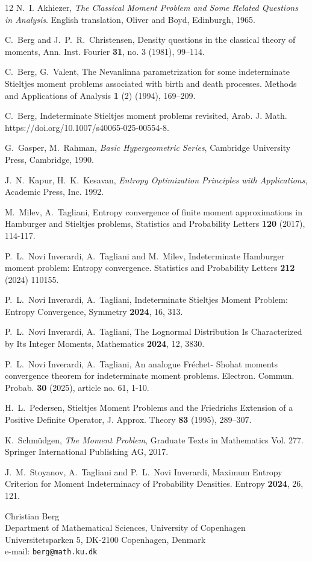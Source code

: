 \documentclass [12pt]{article}
\begin{document}
\begin{thebibliography}{12}
  N.~I. Akhiezer,  {\it The Classical Moment Problem and Some Related
 Questions in Analysis}. English translation, Oliver and Boyd, Edinburgh,
 1965.

 C.~Berg and J.~P.~R.~Christensen,   Density questions in the classical theory of moments,  Ann. Inst. Fourier  {\bf 31}, no. 3 (1981), 99--114.

 C.~Berg, G.~Valent, The Nevanlinna parametrization for some indeterminate Stieltjes moment problems associated with birth and death processes.
Methods and Applications of Analysis {\bf 1} (2) (1994), 169--209.

 C.~Berg, Indeterminate Stieltjes moment problems revisited, Arab. J. Math. https://doi.org/10.1007/s40065-025-00554-8.

 G.~Gasper, M.~Rahman, {\it Basic Hypergeometric Series}, Cambridge University Press, Cambridge, 1990.

 J.~N.~Kapur, H.~K.~Kesavan, {\it Entropy Optimization Principles with Applications}, Academic Press, Inc. 1992.


 M.~Milev, A.~Tagliani, Entropy convergence of finite moment approximations in Hamburger and Stieltjes problems, Statistics and Probability Letters {\bf 120} (2017), 114-117.

 P.~L.~Novi Inverardi, A.~Tagliani  and M.~Milev, Indeterminate Hamburger moment problem: Entropy convergence. Statistics and Probability Letters {\bf 212} (2024) 110155. 

 P.~L.~Novi Inverardi, A.~Tagliani, Indeterminate Stieltjes Moment Problem: Entropy Convergence, Symmetry {\bf 2024}, 16, 313.  

 P.~L.~Novi Inverardi, A.~Tagliani, The Lognormal Distribution Is Characterized  by Its Integer Moments, Mathematics {\bf 2024}, 12, 3830. 

 P.~L.~Novi Inverardi, A.~Tagliani, An analogue Fr{\'e}chet- Shohat moments
convergence theorem for indeterminate moment problems. Electron. Commun. Probab. {\bf 30} (2025), article no. 61, 1-10.

 H.~L.~Pedersen, Stieltjes Moment Problems and the Friedrichs Extension of a Positive Definite Operator, J. Approx. Theory {\bf 83} (1995), 289--307.


 K.~Schm\"{u}dgen, {\it The Moment Problem}, Graduate Texts in Mathematics Vol. 277. Springer International Publishing AG, 2017. 

 J.~M.~Stoyanov, A.~Tagliani and P.~L.~Novi Inverardi, Maximum Entropy Criterion for Moment Indeterminacy of Probability Densities. Entropy {\bf 2024}, 26, 121.
  
\end{thebibliography}

\noindent
Christian Berg\\
Department of Mathematical Sciences, University of Copenhagen\\
Universitetsparken 5, DK-2100 Copenhagen, Denmark\\
e-mail: {\tt{berg@math.ku.dk}}
\end{document}
